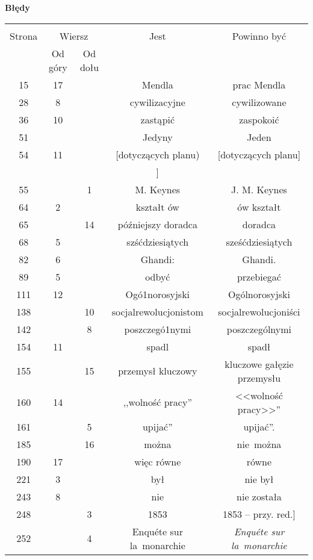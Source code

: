 \documentclass[a4paper,11pt]{article}
\newcommand{\tb}{\textbf}
\newcommand{\Center}[1]{\begin{center} #1 \end{center}}
\newcommand{\CenterTB}[1]{\Center{\tb{#1}}}
\begin{document}
\newpage
\CenterTB{Błędy}
\begin{center}
  \begin{tabular}{|c|c|c|c|c|}
    \hline
    & \multicolumn{2}{c|}{} & & \\
    Strona & \multicolumn{2}{c|}{Wiersz}& Jest & Powinno być \\ \cline{2-3}
    & Od góry & Od dołu & & \\ \hline
    15  & 17 & & Mendla & prac Mendla \\
    28  &  8 & & cywilizacyjne & cywilizowane \\
    36  & 10 & & zastąpić & zaspokoić \\
    51  & & & Jedyny & Jeden \\ %
    54  & 11 & & [dotyczących planu) & [dotyczących planu] \\
    & & & ] & \\
    55  & & 1 & M. Keynes & J. M. Keynes \\
    64  & 2 & & kształt ów & ów kształt \\
    65  & & 14 & późniejszy doradca & doradca \\
    68  &  5 & & szśćdziesiątych & sześćdziesiątych \\
    82  &  6 & & Ghandi: & Ghandi. \\
    89  &  5 & & odbyć & przebiegać \\
    111 & 12 & & Ogó1norosyjski & Ogólnorosyjski \\
    138 & & 10 & socjalrewolucjonistom & socjalrewolucjoniści \\
    142 & &  8 & poszczegó1nymi & poszczególnymi \\
    154 & 11 & & spadl & spadł \\
    155 & & 15 & przemysł kluczowy & kluczowe gałęzie przemysłu \\
    160 & 14 & & ,,wolność pracy'' & <<wolność pracy>>'' \\
    161 & &  5 & upijać'' & upijać''. \\
    185 & & 16 & można & nie~można \\
    190 & 17 & & więc równe & równe \\
    221 &  3 & & był & nie był \\
    243 &  8 & & nie & nie została \\
    248 & & 3 & 1853 & 1853 -- przy. red.] \\
    252 & & 4 & Enqu\'{e}te sur la~monarchie
           & \emph{Enqu\'{e}te sur la~monarchie} \\

\end{tabular}
\end{center}
\end{document}
